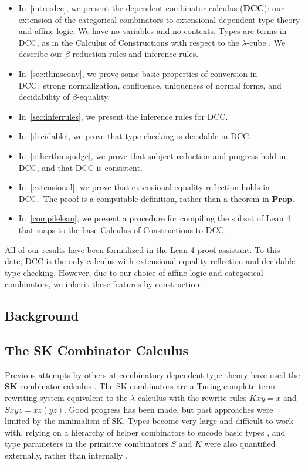 \documentclass{lmcs}
\newcommand{\dccbf}{\(\textbf{DCC}\)}
\newcommand{\sk}{\(\text{SK}\)}
\newcommand{\skbf}{\(\textbf{SK}\)}
\begin{document}
\begin{itemize}
  \item In~\ref{intro:dcc}, we present the dependent combinator calculus (\dccbf): our extension of the categorical combinators \autocite{cmachine} \autocite{CURIEN1986188} to extensional dependent type theory and affine logic. We have no variables and no contexts. Types are terms in DCC, as in the Calculus of Constructions with respect to the \(\lambda\)-cube \autocite{Barendregt_1991}. We describe our \(\beta\)-reduction rules and inference rules.
  \item In~\ref{sec:thmsconv}, we prove some basic properties of conversion in DCC:~strong normalization, confluence, uniqueness of normal forms, and decidability of \(\beta\)-equality.
  \item In~\ref{sec:inferrules}, we present the inference rules for DCC.\@
  \item In~\ref{decidable}, we prove that type checking is decidable in DCC.\@
  \item In~\ref{otherthmsjudge}, we prove that subject-reduction and progress hold in DCC, and that DCC is consistent.
  \item In~\ref{extensional}, we prove that extensional equality reflection holds in DCC.~The proof is a computable definition, rather than a theorem in \(\textbf{Prop}\).
  \item In~\ref{compilelean}, we present a procedure for compiling the subset of Lean 4 that maps to the base Calculus of Constructions to DCC.\@
\end{itemize}

All of our results have been formalized in the Lean 4 proof assistant. To this date, DCC is the only calculus with extensional equality reflection and decidable type-checking. However, due to our choice of affine logic and categorical combinators, we inherit these features by construction.

\subsection*{Background}

\subsection*{The SK Combinator Calculus}

Previous attempts by others at combinatory dependent type theory have used the \skbf{} combinator calculus \autocite[p. 10:14]{altenkirch}.
The \sk{} combinators are a Turing-complete term-rewriting system equivalent to the \(\lambda\)-calculus \cite{altenkirch2023combinatory} with the rewrite rules \(K x y = x\) and \(S x y z = x z (y z)\).
Good progress has been made, but past approaches were limited by the minimalism of \sk{}. Types become very large and difficult to work with, relying on a hierarchy of helper combinators to encode basic types \autocite[10:17][para. 2]{altenkirch}, and type parameters in the primitive combinators \(S\) and \(K\) were also quantified externally, rather than internally \autocite[10:17][para. 2]{altenkirch}.
\end{document}
